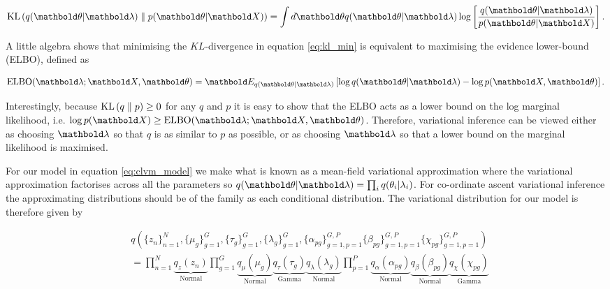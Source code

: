 \begin{equation}
  \KL{q(\mbtheta | \mblambda)}{p(\mbtheta | \mbX)} =
  \int d\mbtheta q(\mbtheta | \mblambda) \log\left[ \frac{q(\mbtheta | \mblambda)}{p(\mbtheta | \mbX)}\right].
\label{eq:kl_min}
\end{equation}

A little algebra shows that minimising the $KL$-divergence in equation \ref{eq:kl_min} is equivalent to maximising the evidence lower-bound (ELBO), defined as

\begin{equation}
  \text{ELBO}(\mblambda; \mbX, \mbtheta) = \mbE_{q(\mbtheta | \mblambda)} \left[
\log q(\mbtheta | \mblambda) - \log p(\mbX, \mbtheta)
  \right].
\end{equation}

Interestingly, because $\textrm{KL}\left(q\;\|\;p\right) \geq 0$ for any $q$ and $p$ it is easy to show that the ELBO acts as a lower bound on the log marginal likelihood, i.e. $\log p(\mbX) \geq \text{ELBO}(\mblambda; \mbX, \mbtheta)$. Therefore, variational inference can be viewed either as choosing $\mblambda$ so that $q$ is as similar to $p$ as possible, or as choosing $\mblambda$ so that a lower bound on the marginal likelihood is maximised.

For our model in equation \ref{eq:clvm_model} we make what is known as a mean-field variational approximation where the variational approximation factorises across all the parameters so $q(\mbtheta | \mblambda) = \prod_i q(\theta_i | \lambda_i)$. For co-ordinate ascent variational inference the approximating distributions should be of the family as each conditional distribution. The variational distribution for our model is therefore given by

\begin{equation}
\begin{aligned}
& q\left(
\{ z_n \}_{n=1}^N,
\{ \mu_g \}_{g=1}^G,
\{ \tau_g \}_{g=1}^G,
\{ \lambda_g \}_{g=1}^G,
\{ \alpha_{pg} \}_{g=1,p=1}^{G,P}
\{ \beta_{pg} \}_{g=1,p=1}^{G,P}
\{ \chi_{pg} \}_{g=1,p=1}^{G,P}
\right) \\
& = \prod_{n=1}^N \underbrace{q_z(z_n)}_{\text{Normal}}
\prod_{g=1}^G \underbrace{q_\mu(\mu_g)}_{\text{Normal}}
\underbrace{q_\tau(\tau_g)}_{\text{Gamma}} \underbrace{q_\lambda(\lambda_g)}_{\text{Normal}}
\prod_{p=1}^P \underbrace{q_\alpha (\alpha_{pg})}_{\text{Normal}}
\underbrace{q_\beta(\beta_{pg})}_{\text{Normal}} \underbrace{q_\chi (\chi_{pg})}_{\text{Gamma}}
\end{aligned}
\end{equation}

